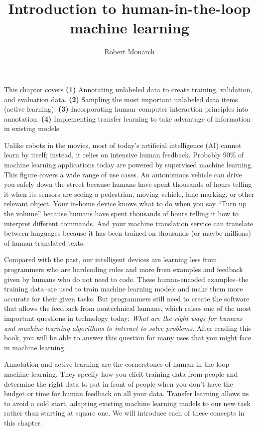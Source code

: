 \documentclass[sigconf,nonacm,screen,pbalance]{acmart}
\begin{document}
\title{Introduction to human-in-the-loop machine learning}
\author{Robert Monarch}
\maketitle

This chapter covers
\textbf{(1)} Annotating unlabeled data to create training, validation, and evaluation data.
\textbf{(2)} Sampling the most important unlabeled data items (active learning).
\textbf{(3)} Incorporating human–computer interaction principles into annotation.
\textbf{(4)} Implementing transfer learning to take advantage of information in existing models.

Unlike robots in the movies, most of today's artificial intelligence (AI) cannot learn by itself; instead, it relies on intensive human feedback. Probably 90\% of machine learning applications today are powered by supervised machine learning. This figure covers a wide range of use cases. An autonomous vehicle can drive you safely down the street because humans have spent thousands of hours telling it when its sensors are seeing a pedestrian, moving vehicle, lane marking, or other relevant object. Your in-home device knows what to do when you say ``Turn up the volume'' because humans have spent thousands of hours telling it how to interpret different commands. And your machine translation service can translate between languages because it has been trained on thousands (or maybe millions) of human-translated texts.

Compared with the past, our intelligent devices are learning less from programmers who are hardcoding rules and more from examples and feedback given by humans who do not need to code. These human-encoded examples--the training data--are used to train machine learning models and make them more accurate for their given tasks. But programmers still need to create the software that allows the feedback from nontechnical humans, which raises one of the most important questions in technology today: {\em What are the right ways for humans and machine learning algorithms to interact to solve problems}. After reading this book, you will be able to answer this question for many uses that you might face in machine learning.

Annotation and active learning are the cornerstones of human-in-the-loop machine learning. They specify how you elicit training data from people and determine the right data to put in front of people when you don't have the budget or time for human feedback on all your data. Transfer learning allows us to avoid a cold start, adapting existing machine learning models to our new task rather than starting at square one. We will introduce each of these concepts in this chapter.
\end{document}
